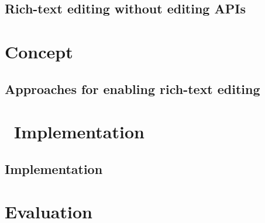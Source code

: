 




\chapter{Rich-text editing without editing APIs}
\label{ch:editing_apis_alt}








\part{Concept}
\label{part-concept}

\chapter{Approaches for enabling rich-text editing}
\label{ch:approaches}



\part{\ Implementation}
\label{part:implementation}

\chapter{Implementation}
\label{ch:impl}



\part{Evaluation}
\label{part:evaluation}

